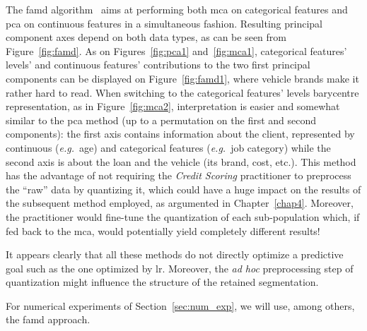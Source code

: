 The \gls{famd} algorithm~\cite{pages2014multiple} aims at performing both \gls{mca} on categorical features and \gls{pca} on continuous features in a simultaneous fashion. Resulting principal component axes depend on both data types, as can be seen from Figure~\ref{fig:famd}. As on Figures~\ref{fig:pca1} and~\ref{fig:mca1}, categorical features' levels' and continuous features' contributions to the two first principal components can be displayed on Figure~\ref{fig:famd1}, where vehicle brands make it rather hard to read. When switching to the categorical features' levels barycentre representation, as in Figure~\ref{fig:mca2}, interpretation is easier and somewhat similar to the \gls{pca} method (up to a permutation on the first and second components): the first axis contains information about the client, represented by continuous (\textit{e.g.}\ age) and categorical features (\textit{e.g.}\ job category) while the second axis is about the loan and the vehicle (its brand, cost, etc.).
This method has the advantage of not requiring the \textit{Credit Scoring} practitioner to preprocess the ``raw'' data by quantizing it, which could have a huge impact on the results of the subsequent method employed, as argumented in Chapter~\ref{chap4}. Moreover, the practitioner would fine-tune the quantization of each sub-population which, if fed back to the \gls{mca}, would potentially yield completely different results!

\medskip

It appears clearly that all these methods do not directly optimize a predictive goal such as the one optimized by \gls{lr}. Moreover, the \textit{ad hoc} preprocessing step of quantization might influence the structure of the retained segmentation. 

For numerical experiments of Section~\ref{sec:num_exp}, we will use, among others, the \gls{famd} approach.

